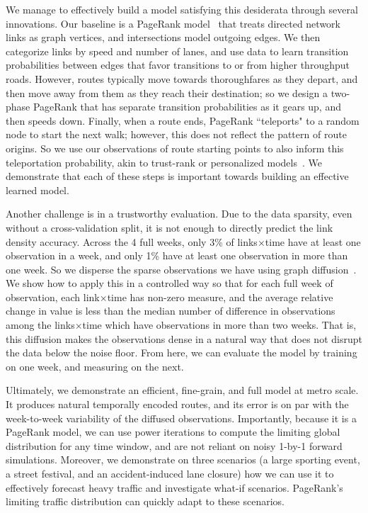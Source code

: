\documentclass[sigconf, review]{acmart}
\begin{document}
We manage to effectively build a model satisfying this desiderata through several innovations.  Our baseline is a PageRank model~\cite{page1999pagerank,gleich2015pagerank} that treats directed network links as graph vertices, and intersections model outgoing edges.  We then categorize links by speed and number of lanes, and use data to learn transition probabilities between edges that favor transitions to or from higher throughput roads.   However, routes typically move towards thoroughfares as they depart, and then move away from them as they reach their destination; so we design a two-phase PageRank that has separate transition probabilities as it gears up, and then speeds down.  Finally, when a route ends, PageRank ``teleports" to a random node to start the next walk; however, this does not reflect the pattern of route origins.  So we use our observations of route starting points to also inform this teleportation probability, akin to trust-rank or personalized models~\cite{gyongyi2004combating,haveliwala2002topic}.  
We demonstrate that each of these steps is important towards building an effective learned model.  

Another challenge is in a trustworthy evaluation.  Due to the data sparsity, even without a cross-validation split, it is not enough to directly predict the link density accuracy.  Across the 4 full weeks, only 3\% of links$\times$time have at least one observation in a week, and only 1\% have at least one observation in more than one week.  
So we disperse the sparse observations we have using graph diffusion~\cite{shuman2013gsp}.  We show how to apply this in a controlled way so that for each full week of observation, each link$\times$time has non-zero measure, and the average relative change in value is less than the median number of difference in observations among the links$\times$time which have observations in more than two weeks.  That is, this diffusion makes the observations dense in a natural way that does not disrupt the data below the noise floor.  
From here, we can evaluate the model by training on one week, and measuring on the next.  

Ultimately, we demonstrate an efficient, fine-grain, and full model at metro scale.  It produces natural temporally encoded routes, and its error is on par with the week-to-week variability of the diffused observations.  
Importantly, because it is a PageRank model, we can use power iterations to compute the limiting global distribution for any time window, and are not reliant on noisy 1-by-1 forward simulations.  
Moreover, we demonstrate on three scenarios (a large sporting event, a street festival, and an accident-induced lane closure) how we can use it to effectively forecast heavy traffic and investigate what-if scenarios.  PageRank's limiting traffic distribution can quickly adapt to these scenarios.  
\end{document}
